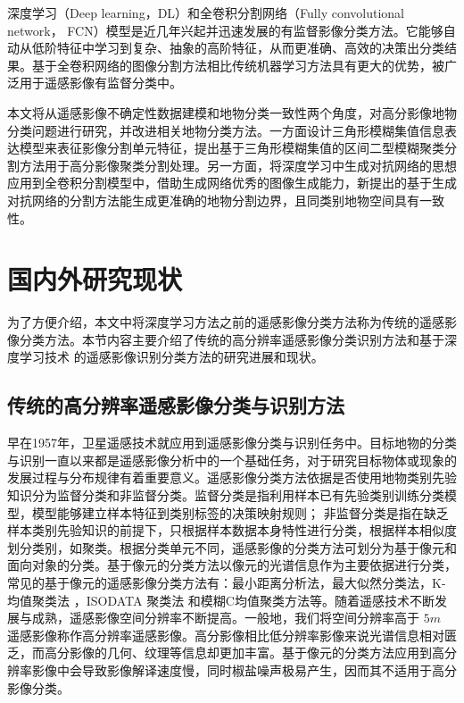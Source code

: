 深度学习（Deep learning，DL）\cite{hinton2006fast}和全卷积分割网络（Fully convolutional network， FCN）\cite{long2015fully}模型是近几年兴起并迅速发展的有监督影像分类方法。它能够自动从低阶特征中学习到复杂、抽象的高阶特征，从而更准确、高效的决策出分类结果。基于全卷积网络的图像分割方法相比传统机器学习方法具有更大的优势，被广泛用于遥感影像有监督分类中。

本文将从遥感影像不确定性数据建模和地物分类一致性两个角度，对高分影像地物分类问题进行研究，并改进相关地物分类方法。一方面设计三角形模糊集值信息表达模型来表征影像分割单元特征，提出基于三角形模糊集值的区间二型模糊聚类分割方法用于高分影像聚类分割处理。另一方面，将深度学习中生成对抗网络的思想应用到全卷积分割模型中，借助生成网络优秀的图像生成能力，新提出的基于生成对抗网络的分割方法能生成更准确的地物分割边界，且同类别地物空间具有一致性。



\section{国内外研究现状}
\label{sec:second}
为了方便介绍，本文中将深度学习方法之前的遥感影像分类方法称为传统的遥感影像分类方法。本节内容主要介绍了传统的高分辨率遥感影像分类识别方法和基于深度学习技术\citep{hinton2006fast, bengio2009learning, NIPS2012_4824} 的遥感影像识别分类方法的研究进展和现状。

\subsection{传统的高分辨率遥感影像分类与识别方法}
\label{subsec:1-2-1}
早在1957年，卫星遥感技术就应用到遥感影像分类与识别任务中。目标地物的分类与识别一直以来都是遥感影像分析中的一个基础任务，对于研究目标物体或现象的发展过程与分布规律有着重要意义\cite{jensen1987introductory}。遥感影像分类方法依据是否使用地物类别先验知识分为监督分类和非监督分类。监督分类是指利用样本已有先验类别训练分类模型，模型能够建立样本特征到类别标签的决策映射规则； 非监督分类是指在缺乏样本类别先验知识的前提下，只根据样本数据本身特性进行分类，根据样本相似度划分类别，如聚类\cite{djukanovic1993unsupervised}。根据分类单元不同，遥感影像的分类方法可划分为基于像元和面向对象的分类。基于像元的分类方法以像元的光谱信息作为主要依据进行分类，常见的基于像元的遥感影像分类方法有：最小距离分析法\cite{wacker1972minimum}，最大似然分类法\cite{strahler1980use}，K-均值聚类法\cite{atkinson2000geostatistical} ，ISODATA 聚类法\cite{paul2002new} 和模糊C均值聚类方法\cite{bezdek1984fcm}等。随着遥感技术不断发展与成熟，遥感影像空间分辨率不断提高。一般地，我们将空间分辨率高于 $5m$ 遥感影像称作高分辨率遥感影像\cite{zhangyongsheng2004}。高分影像相比低分辨率影像来说光谱信息相对匮乏，而高分影像的几何、纹理等信息却更加丰富。基于像元的分类方法应用到高分辨率影像中会导致影像解译速度慢，同时椒盐噪声极易产生，因而其不适用于高分影像分类\cite{blaschke2010object}。

